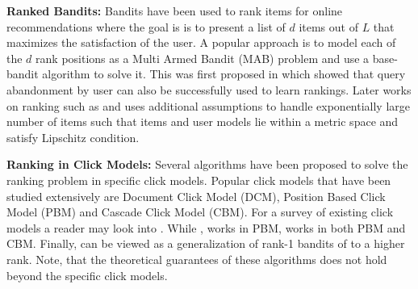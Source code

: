 

\textbf{Ranked Bandits:} Bandits have been used to rank items for online recommendations where the goal is is to present a list of $d$ items out of $L$ that maximizes the satisfaction of the user. A popular approach is to model each of the $d$ rank positions as a Multi Armed Bandit (MAB) problem and use a base-bandit algorithm to solve it. This was first proposed in \citet{radlinski2008learning} which  showed that query abandonment by user can also be successfully used to learn rankings. Later works on ranking such as \citet{slivkins2010ranked} and \citet{slivkins2013ranked} uses additional assumptions to handle  exponentially large number of items such that items and user models lie within a metric space and satisfy Lipschitz condition. 

\textbf{Ranking in Click Models:} Several algorithms have been proposed to solve the ranking problem in specific click models. Popular click models that have been studied extensively are Document Click Model (DCM), Position Based Click Model (PBM) and Cascade Click Model (CBM). For a survey of existing click models a reader may look into \citet{chuklin2015click}. While \citet{katariya2017bernoulli}, \citet{katariya2016stochastic} works in PBM, \citet{zoghi2017online} works in both PBM and CBM. Finally, \citet{kveton2017stochastic} can be viewed as a generalization of rank-1 bandits of \citet{katariya2016stochastic} to a higher rank. Note, that the theoretical guarantees of these algorithms does not hold beyond the specific click models.



